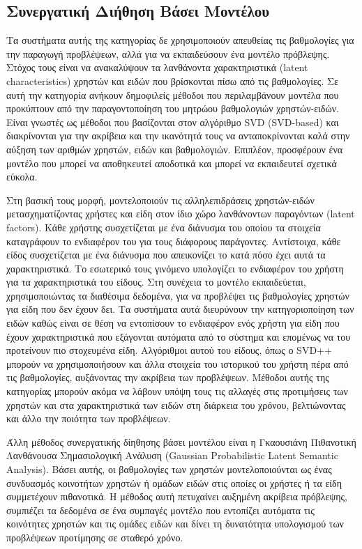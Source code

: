 \subsection{Συνεργατική Διήθηση Βάσει Μοντέλου}
Τα συστήματα αυτής της κατηγορίας δε χρησιμοποιούν απευθείας τις βαθμολογίες για την παραγωγή προβλέψεων, αλλά για να εκπαιδεύσουν ένα μοντέλο πρόβλεψης. Στόχος τους είναι να ανακαλύψουν τα λανθάνοντα χαρακτηριστικά ({\en latent characteristics}) χρηστών και ειδών που βρίσκονται πίσω από τις βαθμολογίες. Σε αυτή την κατηγορία ανήκουν δημοφιλείς μέθοδοι που περιλαμβάνουν μοντέλα που προκύπτουν από την παραγοντοποίηση του μητρώου βαθμολογιών χρηστών-ειδών. Είναι γνωστές ως μέθοδοι που βασίζονται στον αλγόριθμο {\en SVD (SVD-based)} και διακρίνονται για την ακρίβεια και την ικανότητά τους να ανταποκρίνονται καλά στην αύξηση των αριθμών χρηστών, ειδών και βαθμολογιών. Επιπλέον, προσφέρουν ένα μοντέλο που μπορεί να αποθηκευτεί αποδοτικά και μπορεί να εκπαιδευτεί σχετικά εύκολα. \par
Στη βασική τους μορφή, μοντελοποιούν τις αλληλεπιδράσεις χρηστών-ειδών μετασχηματίζοντας χρήστες και είδη στον ίδιο χώρο λανθάνοντων παραγόντων {(\en latent factors)}. Kάθε χρήστης συσχετίζεται με ένα διάνυσμα του οποίου τα στοιχεία καταγράφουν το ενδιαφέρον του για τους διάφορους παράγοντες. Αντίστοιχα, κάθε είδος συσχετίζεται με ένα διάνυσμα που απεικονίζει το κατά πόσο έχει αυτά τα χαρακτηριστικά. Το εσωτερικό τους γινόμενο υπολογίζει το ενδιαφέρον του χρήστη για τα χαρακτηριστικά του είδους. Στη συνέχεια το μοντέλο εκπαιδεύεται, χρησιμοποιώντας τα διαθέσιμα δεδομένα, για να προβλέψει τις βαθμολογίες χρηστών για είδη που δεν έχουν δει. Τα συστήματα αυτά διευρύνουν την κατηγοριοποίη\-ση των ειδών καθώς είναι σε θέση να εντοπίσουν το ενδιαφέρον ενός χρήστη για είδη που έχουν χαρακτηριστικά που εξάγονται αυτόματα από το σύστημα και επομένως να του προτείνουν πιο στοχευμένα είδη. Αλγόριθμοι αυτού του είδους, όπως ο {\en SVD++} \cite{Koren:2008:FMN:1401890.1401944} μπορούν να χρησιμοποιήσουν και άλλα στοιχεία του ιστορικού του χρήστη πέρα από τις βαθμολογίες, αυξάνοντας την ακρίβεια των προβλέψεων. Μέθοδοι αυτής της κατηγορίας μπορούν ακόμα να λάβουν υπόψη τους τις αλλαγές στις προτιμήσεις των χρηστών και στα χαρακτηριστικά των ειδών στη διάρκεια του χρόνου, βελτιώνοντας και άλλο την ποιότητα των προβλέψεων. \cite{ricci2011recommender}\par
Άλλη μέθοδος συνεργατικής δίηθησης βάσει μοντέλου είναι η Γκαουσιάνη Πιθανοτική Λανθάνουσα Σημασιολογική Ανάλυση ({\en Gaussian Probabilistic Latent Semantic Analysis})\cite{hofmann2003collaborative}. Βάσει αυτής, οι βαθμολογίες των χρηστών μοντελοποιού\-νται ως ένας συνδυασμός κοινοτήτων χρηστών ή ομάδων ειδών στις οποίες οι χρήστες ή τα είδη συμμετέχουν πιθανοτικά. Η μέθοδος αυτή πετυχαίνει αυξημένη ακρίβεια πρόβλεψης, συμπιέζει τα δεδομένα σε ένα συμπαγές μοντέλο που εντοπίζει αυτόματα τις κοινότητες χρηστών και τις ομάδες ειδών και δίνει τη δυνατότητα υπολογισμού των προβλέψεων προτίμησης σε σταθερό χρόνο.
